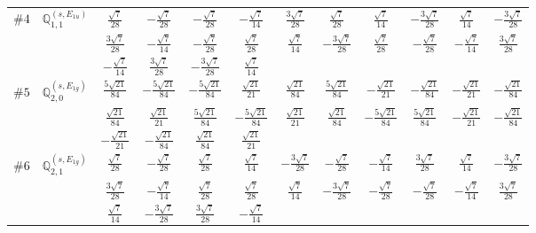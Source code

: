 \documentclass[fleqn,9pt,landscape]{jsarticle}
\begin{document}
\begin{center}
\begin{longtable}{lcccccccccc}
$ \#4\quad \mathbb{Q}_{1,1}^{(s,E_{1u})} $ & $ \frac{\sqrt{7}}{28} $ & $ - \frac{\sqrt{7}}{28} $ & $ - \frac{\sqrt{7}}{28} $ & $ - \frac{\sqrt{7}}{14} $ & $ \frac{3 \sqrt{7}}{28} $ & $ \frac{\sqrt{7}}{28} $ & $ \frac{\sqrt{7}}{14} $ & $ - \frac{3 \sqrt{7}}{28} $ & $ \frac{\sqrt{7}}{14} $ & $ - \frac{3 \sqrt{7}}{28} $ \\
& $ \frac{3 \sqrt{7}}{28} $ & $ - \frac{\sqrt{7}}{14} $ & $ - \frac{\sqrt{7}}{28} $ & $ \frac{\sqrt{7}}{28} $ & $ \frac{\sqrt{7}}{14} $ & $ - \frac{3 \sqrt{7}}{28} $ & $ \frac{\sqrt{7}}{28} $ & $ - \frac{\sqrt{7}}{28} $ & $ - \frac{\sqrt{7}}{14} $ & $ \frac{3 \sqrt{7}}{28} $ \\
& $ - \frac{\sqrt{7}}{14} $ & $ \frac{3 \sqrt{7}}{28} $ & $ - \frac{3 \sqrt{7}}{28} $ & $ \frac{\sqrt{7}}{14} $ & $  $ & $  $ & $  $ & $  $ & $  $ & $  $ \\ \hline
$ \#5\quad \mathbb{Q}_{2,0}^{(s,E_{1g})} $ & $ \frac{5 \sqrt{21}}{84} $ & $ - \frac{5 \sqrt{21}}{84} $ & $ - \frac{5 \sqrt{21}}{84} $ & $ \frac{\sqrt{21}}{21} $ & $ \frac{\sqrt{21}}{84} $ & $ \frac{5 \sqrt{21}}{84} $ & $ - \frac{\sqrt{21}}{21} $ & $ - \frac{\sqrt{21}}{84} $ & $ - \frac{\sqrt{21}}{21} $ & $ - \frac{\sqrt{21}}{84} $ \\
& $ \frac{\sqrt{21}}{84} $ & $ \frac{\sqrt{21}}{21} $ & $ \frac{5 \sqrt{21}}{84} $ & $ - \frac{5 \sqrt{21}}{84} $ & $ \frac{\sqrt{21}}{21} $ & $ \frac{\sqrt{21}}{84} $ & $ - \frac{5 \sqrt{21}}{84} $ & $ \frac{5 \sqrt{21}}{84} $ & $ - \frac{\sqrt{21}}{21} $ & $ - \frac{\sqrt{21}}{84} $ \\
& $ - \frac{\sqrt{21}}{21} $ & $ - \frac{\sqrt{21}}{84} $ & $ \frac{\sqrt{21}}{84} $ & $ \frac{\sqrt{21}}{21} $ & $  $ & $  $ & $  $ & $  $ & $  $ & $  $ \\ \hline
$ \#6\quad \mathbb{Q}_{2,1}^{(s,E_{1g})} $ & $ \frac{\sqrt{7}}{28} $ & $ - \frac{\sqrt{7}}{28} $ & $ \frac{\sqrt{7}}{28} $ & $ \frac{\sqrt{7}}{14} $ & $ - \frac{3 \sqrt{7}}{28} $ & $ - \frac{\sqrt{7}}{28} $ & $ - \frac{\sqrt{7}}{14} $ & $ \frac{3 \sqrt{7}}{28} $ & $ \frac{\sqrt{7}}{14} $ & $ - \frac{3 \sqrt{7}}{28} $ \\
& $ \frac{3 \sqrt{7}}{28} $ & $ - \frac{\sqrt{7}}{14} $ & $ \frac{\sqrt{7}}{28} $ & $ \frac{\sqrt{7}}{28} $ & $ \frac{\sqrt{7}}{14} $ & $ - \frac{3 \sqrt{7}}{28} $ & $ - \frac{\sqrt{7}}{28} $ & $ - \frac{\sqrt{7}}{28} $ & $ - \frac{\sqrt{7}}{14} $ & $ \frac{3 \sqrt{7}}{28} $ \\
& $ \frac{\sqrt{7}}{14} $ & $ - \frac{3 \sqrt{7}}{28} $ & $ \frac{3 \sqrt{7}}{28} $ & $ - \frac{\sqrt{7}}{14} $ & $  $ & $  $ & $  $ & $  $ & $  $ & $  $ \\ \hline

\end{longtable}
\end{center}
\end{document}
